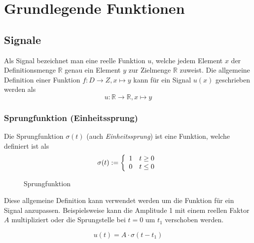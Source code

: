 \chapter{Grundlegende Funktionen}

\newpage

\section{Signale}
Als Signal bezeichnet man eine reelle Funktion $u$, welche jedem Element
$x$ der Definitionsmenge $\mathbb{R}$ genau ein Element $y$ zur
Zielmenge $\mathbb{R}$ zuweist. 
Die allgemeine Definition einer Funktion 
$f : D \rightarrow Z, x \mapsto y$ kann für ein Signal $u(x)$ geschrieben 
werden als
\[ u : \mathbb{R} \rightarrow \mathbb{R}, x \mapsto y \]

\subsection{Sprungfunktion (Einheitssprung)}
Die Sprungfunktion $\sigma(t)$ (auch \emph{Einheitssprung}) ist eine 
Funktion, welche definiert ist als
\[ 
	\sigma(t) := \left\{
		\begin{array}{c c}
			1 & t \geq 0 \\
			0 & t \leq 0
		\end{array}
		\right.
\]

\begin{figure}[h!]
	\centering
	\caption{Sprungfunktion}
	\label{fig:sprungfunktion}
\end{figure}

Diese allgemeine Definition kann verwendet werden um die Funktion für
ein Signal anzupassen. Beispielsweise kann die Amplitude 1 mit einem 
reellen Faktor $A$ multipliziert oder die Sprungstelle bei $t=0$ um 
$t_1$ verschoben werden.

\[  
	u(t) = A \cdot \sigma(t-t_1)
\]

